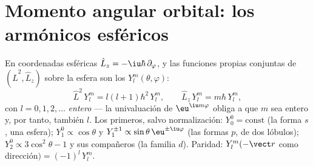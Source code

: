 \section{Momento angular orbital: los armónicos esféricos}

\begin{proposition}\label{prop:b3:quantum-angular-momentum:harmonics}
En coordenadas esféricas $\hat L_z = -\iu\hbar\,\partial_\varphi$,
y las funciones propias conjuntas de $(\hat L^2, \hat L_z)$ sobre la esfera
son los \emph{} $Y_l^m(\theta, \varphi)$:
\[
\hat L^2\,Y_l^m = l(l+1)\hbar^2\,Y_l^m , \qquad
\hat L_z\,Y_l^m = m\hbar\,Y_l^m ,
\]
con $l = 0, 1, 2, \dots$ \emph{entero} --- la univaluación de
$\eu^{\iu m\varphi}$ obliga a que $m$ sea entero y, por tanto, también $l$. Los
primeros, salvo normalización: $Y_0^0 = \text{const}$ (la forma $s$,
una esfera); $Y_1^0 \propto \cos\theta$ y $Y_1^{\pm1}
\propto \sin\theta\,\eu^{\pm\iu\varphi}$ (las formas $p$, de dos lóbulos);
$Y_2^0 \propto 3\cos^2\theta - 1$ y sus compañeros (la familia $d$).
Paridad: $Y_l^m(-\vect r$ como dirección$) = (-1)^l\,Y_l^m$.
\end{proposition}
\admitted

